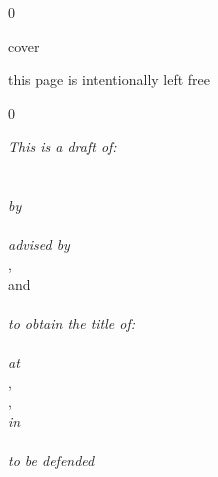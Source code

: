 \documentclass[
    b5paper,  %
    10pt, %
    final, %
    twoside, %
    openright, %
    livetypeset %
]{compostelathesis}
\title{\myTitle}
\date{\myTime}
\author{\myName}
\newcommand\SkipFrontmatter{0}
\begin{document}
\pagestyle{compostela}


\if\SkipFrontmatter0
    \if{}
        \begin{center}\vspace*{4cm}cover  \end{center}
        \cleardoublepage
        \thispagestyle{empty}
        \begin{center}\vspace*{4cm}this page is intentionally left free\end{center}
        \cleardoublepage
    \else
        
        \cleardoublepage
        \thispagestyle{empty}
        \phantom{this page is left free}
        \cleardoublepage
    \fi
\fi




\if\SkipFrontmatter0
    \frontmatter
    \glsunsetall
    \if{}
        \thispagestyle{empty}
        \begin{center}
        \emph{This is a draft of:}\\[1cm]
        \HUGE\myTitle\\[1cm]
        \Large\mySubtitle\\[1cm]
        \normalsize
        \emph{by}\\[1cm]
        \myName\\[2cm]
        \emph{advised by}\\
        \myPromotor, \myCopromotor\\
        and\\
        \myAdvisor\\[1cm]
        \emph{to obtain the title of:}\\
        \myDegree\\
        \emph{at}\\
        \myInstitute, \myFaculty\\
        \myDepartment, \myUniversity\\
        \emph{in}\\
        \myLocation\\[1cm]
        \emph{to be defended}\\
        \myTime

        \vfill
        \myVersion
        \end{center}
    \else
      \maketitle
    \fi
    
    
    
    
    
    \glsresetall
    
\fi
\end{document}
